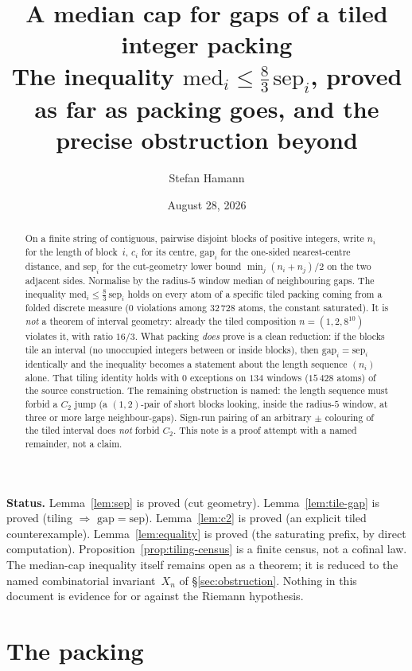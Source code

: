 \documentclass[11pt]{article}
\title{\bfseries A median cap for gaps of a tiled integer packing\\[2mm]
\large The inequality $\mathrm{med}_i\le\tfrac83\,\mathrm{sep}_i$,
proved as far as packing goes, and the precise obstruction beyond}
\author{Stefan Hamann}
\date{August 28, 2026}
\theoremstyle{remark}
\begin{document}
\maketitle

\begin{abstract}\noindent
On a finite string of contiguous, pairwise disjoint blocks of
positive integers, write $n_i$ for the length of block~$i$,
$c_i$ for its centre, $\mathrm{gap}_i$ for the one-sided nearest-centre
distance, and $\mathrm{sep}_i$ for the cut-geometry lower bound
$\min_j(n_i+n_j)/2$ on the two adjacent sides.  Normalise by the
radius-$5$ window median of neighbouring gaps.  The inequality
$\mathrm{med}_i\le\tfrac83\,\mathrm{sep}_i$ holds on every atom of a
specific tiled packing coming from a folded discrete measure
($0$ violations among $32\,728$ atoms, the constant saturated).
It is \emph{not} a theorem of interval geometry: already the
tiled composition $n=(1,2,8^{10})$ violates it, with ratio
$16/3$.  What packing \emph{does} prove is a clean reduction:
if the blocks tile an interval (no unoccupied integers between
or inside blocks), then $\mathrm{gap}_i=\mathrm{sep}_i$ identically
and the inequality becomes a statement about the length sequence
$(n_i)$ alone.  That tiling identity holds with $0$ exceptions
on $134$ windows ($15\,428$ atoms) of the source construction.
The remaining obstruction is named: the length sequence must
forbid a $C_2$ jump (a $(1,2)$-pair of short blocks looking, inside
the radius-$5$ window, at three or more large neighbour-gaps).
Sign-run pairing of an arbitrary $\pm$ colouring of the tiled
interval does \emph{not} forbid $C_2$.  This note is a proof
attempt with a named remainder, not a claim.
\end{abstract}

\medskip\noindent
\textbf{Status.}\enspace
Lemma~\ref{lem:sep} is proved (cut geometry).
Lemma~\ref{lem:tile-gap} is proved (tiling $\Rightarrow$
$\mathrm{gap}=\mathrm{sep}$).
Lemma~\ref{lem:c2} is proved (an explicit tiled counterexample).
Lemma~\ref{lem:equality} is proved (the saturating prefix, by
direct computation).
Proposition~\ref{prop:tiling-census} is a finite census, not a
cofinal law.
The median-cap inequality itself remains open as a theorem; it is
reduced to the named combinatorial invariant~$X_n$ of
\S\ref{sec:obstruction}.
Nothing in this document is evidence for or against the Riemann
hypothesis.

\section{The packing}\label{sec:pack}
\end{document}
